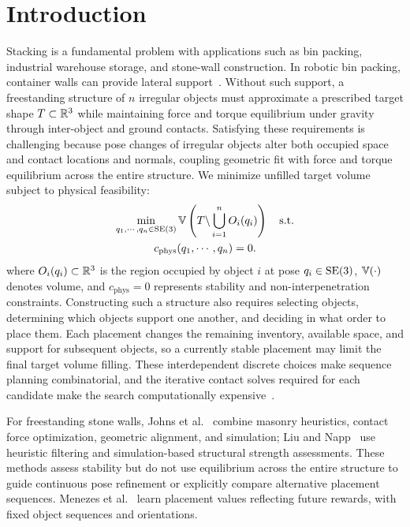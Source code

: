 \section{Introduction} \label{sec:introduction}

Stacking is a fundamental problem with applications such as bin packing, industrial warehouse storage, and stone-wall construction.
In robotic bin packing, container walls can provide lateral support~\cite{wang2022binpacking}.
Without such support, a freestanding structure of $n$ irregular objects must approximate a prescribed target shape $T\subset\mathbb{R}^3$ while maintaining force and torque equilibrium under gravity through inter-object and ground contacts.
Satisfying these requirements is challenging because pose changes of irregular objects alter both occupied space and contact locations and normals, coupling geometric fit with force and torque equilibrium across the entire structure.
We minimize unfilled target volume subject to physical feasibility:
\begin{gather}
\min_{q_1,\cdots,q_n\in\text{SE}(3)} \mathbb{V}\left(T\backslash\bigcup_{i=1}^{n}O_i(q_i)\right)\quad\text{s.t.} \label{eq:problem_definition}\\
c_\text{phys}(q_1,\cdots,q_n)=0. \nonumber
\end{gather}
where $O_i(q_i)\subset\mathbb{R}^3$ is the region occupied by object $i$ at pose $q_i\in\text{SE}(3)$, $\mathbb{V}(\cdot)$ denotes volume, and $c_\text{phys}=0$ represents stability and non-interpenetration constraints.
Constructing such a structure also requires selecting objects, determining which objects support one another, and deciding in what order to place them.
Each placement changes the remaining inventory, available space, and support for subsequent objects, so a currently stable placement may limit the final target volume filling.
These interdependent discrete choices make sequence planning combinatorial, and the iterative contact solves required for each candidate make the search computationally expensive~\cite{furrer2017stacking}.





For freestanding stone walls, Johns et al.~\cite{johns2020autonomous,johns2023framework} combine masonry heuristics, contact force optimization, geometric alignment, and simulation; Liu and Napp~\cite{liu2023stability} use heuristic filtering and simulation-based structural strength assessments.
These methods assess stability but do not use equilibrium across the entire structure to guide continuous pose refinement or explicitly compare alternative placement sequences.
Menezes et al.~\cite{menezes2021rocks} learn placement values reflecting future rewards, with fixed object sequences and orientations.

